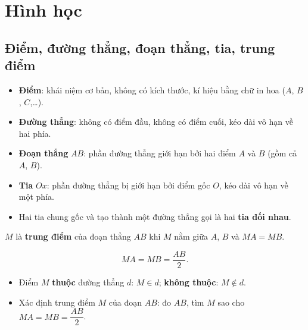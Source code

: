 \documentclass[12pt,a4paper]{article}
\begin{document}
\section{Hình học}

\subsection{Điểm, đường thẳng, đoạn thẳng, tia, trung điểm}

\begin{dinhnghia}
\begin{itemize}
  \item \textbf{Điểm}: khái niệm cơ bản, không có kích thước, kí hiệu bằng chữ in hoa ($A$, $B$, $C$,\ldots).
  \item \textbf{Đường thẳng}: không có điểm đầu, không có điểm cuối, kéo dài vô hạn về hai phía.
  \item \textbf{Đoạn thẳng} $AB$: phần đường thẳng giới hạn bởi hai điểm $A$ và $B$ (gồm cả $A$, $B$).
  \item \textbf{Tia} $Ox$: phần đường thẳng bị giới hạn bởi điểm gốc $O$, kéo dài vô hạn về một phía.
  \item Hai tia chung gốc và tạo thành một đường thẳng gọi là hai \textbf{tia đối nhau}.
\end{itemize}
\end{dinhnghia}

\begin{dinhnghia}[title={Trung điểm}]
$M$ là \textbf{trung điểm} của đoạn thẳng $AB$ khi $M$ nằm giữa $A$, $B$ và $MA = MB$.

\[MA = MB = \frac{AB}{2}.\]
\end{dinhnghia}

\begin{luuy}
\begin{itemize}
  \item Điểm $M$ \textbf{thuộc} đường thẳng $d$: $M \in d$; \textbf{không thuộc}: $M \notin d$.
\end{itemize}
\end{luuy}

\begin{vidu}
\begin{itemize}
  \item Xác định trung điểm $M$ của đoạn $AB$: đo $AB$, tìm $M$ sao cho $MA = MB = \dfrac{AB}{2}$.
\end{itemize}
\end{vidu}
\end{document}
